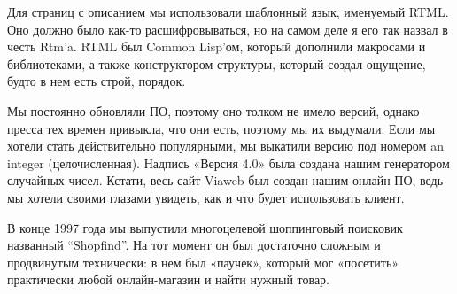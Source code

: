 \documentclass[ebook,12pt,oneside,openany]{memoir}
\begin{document}
Для страниц с описанием мы использовали шаблонный язык, именуемый
RTML. Оно должно было как-то расшифровываться, но на самом деле я его
так назвал в честь Rtm’a. RTML был Common Lisp’ом, который дополнили
макросами и библиотеками, а также конструктором структуры, который
создал ощущение, будто в нем есть строй, порядок. \newline

Мы постоянно обновляли ПО, поэтому оно толком не имело версий, однако
пресса тех времен привыкла, что они есть, поэтому мы их выдумали. Если
мы хотели стать действительно популярными, мы выкатили версию под
номером an integer (целочисленная). Надпись «Версия 4.0» была создана
нашим генератором случайных чисел. Кстати, весь сайт Viaweb был создан
нашим онлайн ПО, ведь мы хотели своими глазами увидеть, как и что
будет использовать клиент. \newline

В конце 1997 года мы выпустили многоцелевой шоппинговый поисковик
названный “Shopfind”. На тот момент он был достаточно сложным и
продвинутым технически: в нем был «паучек», который мог «посетить»
практически любой онлайн-магазин и найти нужный товар. \newline
\end{document}
